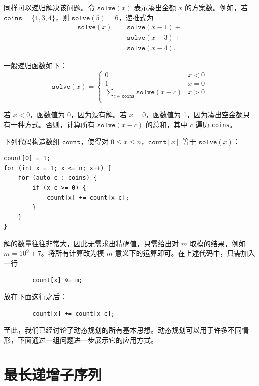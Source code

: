 同样可以递归解决该问题。令 $\texttt{solve}(x)$ 表示凑出金额 $x$ 的方案数。例如，若 $\texttt{coins}=\{1,3,4\}$，则 $\texttt{solve}(5)=6$，递推式为
\begin{equation*}
\begin{split}
\texttt{solve}(x) = & \texttt{solve}(x-1) + \\
                    & \texttt{solve}(x-3) + \\
                    & \texttt{solve}(x-4)  .
\end{split}
\end{equation*}

一般递归函数如下：
\begin{equation*}
    \texttt{solve}(x) = \begin{cases}
               0               & x < 0\\
               1               & x = 0\\
               \sum_{c \in \texttt{coins}} \texttt{solve}(x-c) & x > 0 \\
           \end{cases}
\end{equation*}

若 $x<0$，函数值为 0，因为没有解。若 $x=0$，函数值为 1，因为凑出空金额只有一种方式。否则，计算所有 $\texttt{solve}(x-c)$ 的总和，其中 $c$ 遍历 \texttt{coins}。

下列代码构造数组 $\texttt{count}$，使得对 $0\le x\le n$，$\texttt{count}[x]$ 等于 $\texttt{solve}(x)$：

\begin{lstlisting}
count[0] = 1;
for (int x = 1; x <= n; x++) {
    for (auto c : coins) {
        if (x-c >= 0) {
            count[x] += count[x-c];
        }
    }
}
\end{lstlisting}

解的数量往往非常大，因此无需求出精确值，只需给出对 $m$ 取模的结果，例如 $m=10^9+7$。将所有计算改为模 $m$ 意义下的运算即可。在上述代码中，只需加入一行
\begin{lstlisting}
        count[x] %= m;
\end{lstlisting}
放在下面这行之后：
\begin{lstlisting}
        count[x] += count[x-c];
\end{lstlisting}

至此，我们已经讨论了动态规划的所有基本思想。动态规划可以用于许多不同情形，下面通过一组问题进一步展示它的应用方式。

\section{最长递增子序列}

